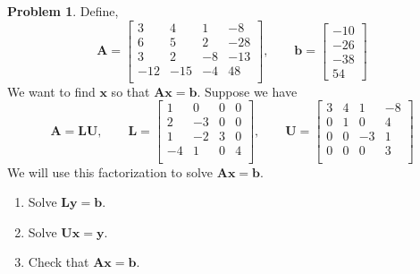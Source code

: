\documentclass[12pt]{article}
\theoremstyle{definition}
\newtheorem{problem}{Problem}
\renewcommand{\vec}{\mathbf}
\begin{document}
\begin{problem}

    Define,
    \begin{equation*}
        \vec{A} =
        \begin{bmatrix}
         3 & 4 & 1 & -8 \\
         6 & 5 & 2 & -28 \\
         3 & 2 & -8 & -13 \\
         -12 & -15 & -4 & 48 \\
        \end{bmatrix}
        ,\qquad
        \vec{b} = 
        \begin{bmatrix}-10\\-26\\-38\\54\end{bmatrix}
        \end{equation*}
        We want to find $\vec{x}$ so that $\vec{A}\vec{x} = \vec{b}$.
        Suppose we have
        \[
            \vec{A} = \vec{L}\vec{U},\qquad
        \vec{L} = 
        \begin{bmatrix}
     1 & 0 & 0 & 0 \\
     2 & -3 & 0 & 0 \\
     1 & -2 & 3 & 0 \\
     -4 & 1 & 0 & 4 \\
        \end{bmatrix}
        ,\qquad
        \vec{U} = 
        \begin{bmatrix}
     3 & 4 & 1 & -8 \\
     0 & 1 & 0 & 4 \\
     0 & 0 & -3 & 1 \\
     0 & 0 & 0 & 3 \\
        \end{bmatrix}
        \]
        We will use this factorization to solve $\vec{A} \vec{x} = \vec{b}$.

        \begin{enumerate}
        \item Solve $\vec{L}\vec{y} = \vec{b}$.
        \item Solve $\vec{U}\vec{x} = \vec{y}$.
        \item Check that $\vec{A}\vec{x} = \vec{b}$.
        \end{enumerate}
    
    \end{problem}
    
\end{document}
